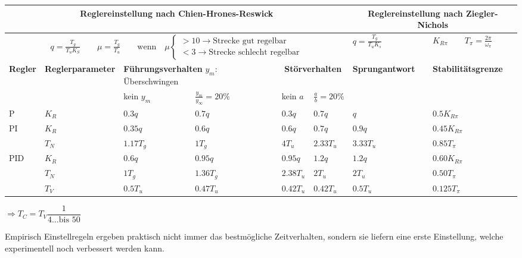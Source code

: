 	\begin{tabular}{|l|p{1.8cm}|l|l|l|l||l|l|}
	    \hline
	    \multicolumn{6}{|c||}{
	      \textbf{Reglereinstellung nach Chien-Hrones-Reswick}
	    } &
	    \multicolumn{2}{|c|}{
	      \textbf{Reglereinstellung nach Ziegler-Nichols}
	    }
		\\ \hline
		\multicolumn{6}{|c||}{
		  $
		  q = \frac{T_g}{T_uK_S} \qquad \mu = \frac{T_g}{T_u}
		  \qquad \text{wenn} \quad \mu
		  \begin{cases}
		    > 10 \rightarrow \text{Strecke gut regelbar} \\
		    < 3 \rightarrow \text{Strecke schlecht regelbar}
		  \end{cases}
		  $
		} & $q=\frac{T_g}{T_uK_s}$ & $K_{R\pi} \qquad T_\pi=\frac{2\pi}{\omega_\pi}$
		\\ \hline
		\textbf{Regler} & \textbf{Regler\-parameter} &
		\multicolumn{2}{|p{3.5cm}|}{\textbf{Führungsverhalten} \newline $y_m$:
		Überschwingen} &
		\multicolumn{2}{|c||}{\textbf{Störverhalten}} &
		\textbf{Sprungantwort} & \textbf{Stabilitätsgrenze}
		\\ \hline
		& & kein $y_m$ & $\frac{y_m}{y_\infty} = 20 \%$ & kein $a$ & $\frac{a}{b}= 20 \%$ & &
		\\ \hline
		P 	& $K_R$ 	& $0.3q$ 	& $0.7q$ 	& $0.3q$ 	& $0.7q$	& $q$ 	& $0.5K_{R\pi}$
		\\ \hline
		PI	& $K_R$		& $0.35q$	& $0.6q$	& $0.6q$	& $0.7q$	& $0.9q$ 	& $0.45K_{R\pi}$
		\\
		    & $T_N$		& $1.17T_g$	& $1T_g$	& $4T_u$	& $2.33T_u$ & $3.33T_u$ &
		    $0.85T_{\pi}$ \\ \hline
		PID & $K_R$		& $0.6q$	& $0.95q$	& $0.95q$	& $1.2q$ 	& $1.2q$ 	& $0.60K_{R\pi}$
		\\
			& $T_N$		& $1T_g$	& $1.36T_g$	& $2.38T_u$	& $2T_u$ 	& $2T_u$	& $0.50T_\pi$
		\\
			& $T_V$		& $0.5T_u$	& $0.47T_u$	& $0.42T_u$	& $0.42T_u$ & $0.5T_u$ 	& $0.125T_\pi$
		\\ \hline
	\end{tabular}
  
  \parbox{5cm}{$\Rightarrow \boxed{T_C = T_V\dfrac{1}{4 \ldots \text{bis } 50}}$}
  \parbox{14cm}{Empirisch Einstellregeln ergeben praktisch nicht immer das bestmögliche Zeitverhalten,
  sondern sie liefern eine erste Einstellung, welche experimentell noch verbessert werden kann.} \\ \\
  
